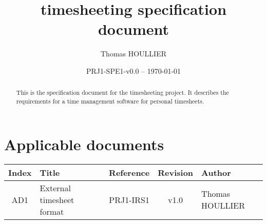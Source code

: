 \documentclass[letterpaper]{article}
\title{timesheeting specification document}
\author{Thomas HOULLIER}
\begin{document}
\frenchspacing
\date{PRJ1-SPE1-v0.0 -- \today}
\maketitle
\thispagestyle{FirstPage}

\begin{abstract}
  This is the specification document for the timesheeting project.
  It describes the requirements for a time management software for
  personal timesheets.
\end{abstract}

\begin{versionhistory}
\end{versionhistory}
\setcounter{table}{0} %

\section*{Applicable documents}
{ \centering
\begin{tabularx}{\textwidth}{| c | X | c | c | X |} \hline
  Index & Title & Reference & Revision & Author \\ \hline
  AD1   & External timesheet format & PRJ1-IRS1 & v1.0 & Thomas HOULLIER \\
\hline \end{tabularx} \par }
\tableofcontents
\printglossary[type=\acronymtype,style=index]
\pagestyle{plain}



\appendix
\cleardoublepage


\apptocmd{\thebibliography}{\raggedright}{}{}
\begingroup
{}
\setlength\bibitemsep{0pt}
\printbibliography
\endgroup
\end{document}
